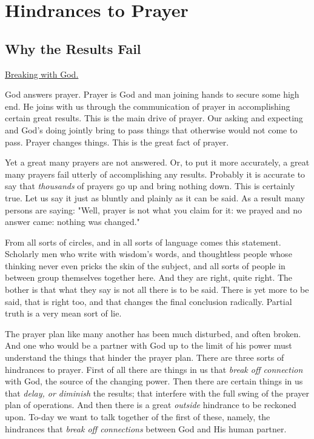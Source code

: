 \part{ Hindrances to Prayer}





\chapter{Why the Results Fail}



\underline{Breaking with God.}


God answers prayer. Prayer is God and man joining hands to secure some
high end. He joins with us through the communication of prayer in
accomplishing certain great results. This is the main drive of prayer. Our
asking and expecting and God's doing jointly bring to pass things that
otherwise would not come to pass. Prayer changes things. This is the great
fact of prayer.

Yet a great many prayers are not answered. Or, to put it more accurately,
a great many prayers fail utterly of accomplishing any results. Probably
it is accurate to say that \textit{thousands} of prayers go up and bring nothing
down. This is certainly true. Let us say it just as bluntly and plainly as
it can be said. As a result many persons are saying: "Well, prayer is not
what you claim for it: we prayed and no answer came: nothing was changed."

From all sorts of circles, and in all sorts of language comes this
statement. Scholarly men who write with wisdom's words, and thoughtless
people whose thinking never even pricks the skin of the subject, and all
sorts of people in between group themselves together here. And they are
right, quite right. The bother is that what they say is not all there is
to be said. There is yet more to be said, that is right too, and that
changes the final conclusion radically. Partial truth is a very mean sort
of lie.

The prayer plan like many another has been much disturbed, and often
broken. And one who would be a partner with God up to the limit of his
power must understand the things that hinder the prayer plan. There are
three sorts of hindrances to prayer. First of all there are things in us
that \textit{break off connection} with God, the source of the changing power.
Then there are certain things in us that \textit{delay, or diminish} the results;
that interfere with the full swing of the prayer plan of operations. And
then there is a great \textit{outside} hindrance to be reckoned upon. To-day we
want to talk together of the first of these, namely, the hindrances that
\textit{break off connections} between God and His human partner.


